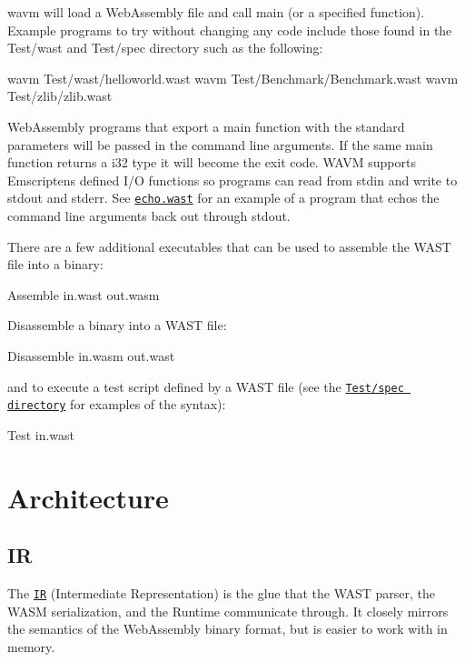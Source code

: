 {\ttfamily wavm} will load a Web\+Assembly file and call {\ttfamily main} (or a specified function). Example programs to try without changing any code include those found in the Test/wast and Test/spec directory such as the following\+:


\begin{DoxyCode}
wavm Test/wast/helloworld.wast
wavm Test/Benchmark/Benchmark.wast
wavm Test/zlib/zlib.wast
\end{DoxyCode}


Web\+Assembly programs that export a main function with the standard parameters will be passed in the command line arguments. If the same main function returns a i32 type it will become the exit code. W\+A\+VM supports Emscripten\textquotesingle{}s defined I/O functions so programs can read from stdin and write to stdout and stderr. See \href{Test/wast/echo.wast}{\tt echo.\+wast} for an example of a program that echos the command line arguments back out through stdout.

There are a few additional executables that can be used to assemble the W\+A\+ST file into a binary\+:


\begin{DoxyCode}
Assemble in.wast out.wasm
\end{DoxyCode}


Disassemble a binary into a W\+A\+ST file\+:


\begin{DoxyCode}
Disassemble in.wasm out.wast
\end{DoxyCode}


and to execute a test script defined by a W\+A\+ST file (see the \href{Test/spec}{\tt Test/spec directory} for examples of the syntax)\+:


\begin{DoxyCode}
Test in.wast
\end{DoxyCode}


\section*{Architecture}

\subsection*{IR}

The \href{Include/IR}{\tt IR} (Intermediate Representation) is the glue that the W\+A\+ST parser, the W\+A\+SM serialization, and the Runtime communicate through. It closely mirrors the semantics of the Web\+Assembly binary format, but is easier to work with in memory.

